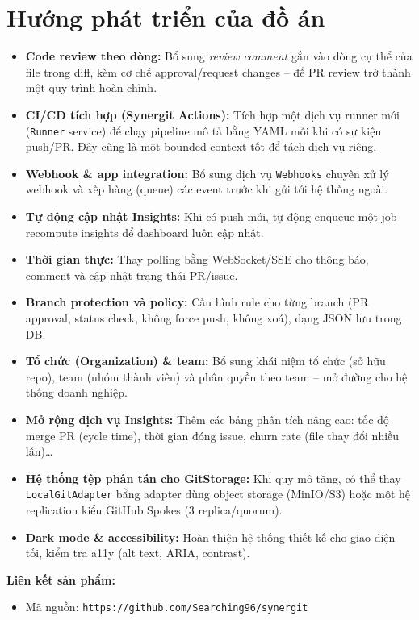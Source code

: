 \section{Hướng phát triển của đồ án}
\begin{itemize}
\item \textbf{Code review theo dòng:} Bổ sung \textit{review comment} gắn vào dòng cụ thể của file trong diff, kèm cơ chế approval/request changes -- để PR review trở thành một quy trình hoàn chỉnh.
\item \textbf{CI/CD tích hợp (Synergit Actions):} Tích hợp một dịch vụ runner mới (\texttt{Runner} service) để chạy pipeline mô tả bằng YAML mỗi khi có sự kiện push/PR. Đây cũng là một bounded context tốt để tách dịch vụ riêng.
\item \textbf{Webhook \& app integration:} Bổ sung dịch vụ \texttt{Webhooks} chuyên xử lý webhook và xếp hàng (queue) các event trước khi gửi tới hệ thống ngoài.
\item \textbf{Tự động cập nhật Insights:} Khi có push mới, tự động enqueue một job recompute insights để dashboard luôn cập nhật.
\item \textbf{Thời gian thực:} Thay polling bằng WebSocket/SSE cho thông báo, comment và cập nhật trạng thái PR/issue.
\item \textbf{Branch protection và policy:} Cấu hình rule cho từng branch (PR approval, status check, không force push, không xoá), dạng JSON lưu trong DB.
\item \textbf{Tổ chức (Organization) \& team:} Bổ sung khái niệm tổ chức (sở hữu repo), team (nhóm thành viên) và phân quyền theo team -- mở đường cho hệ thống doanh nghiệp.
\item \textbf{Mở rộng dịch vụ Insights:} Thêm các bảng phân tích nâng cao: tốc độ merge PR (cycle time), thời gian đóng issue, churn rate (file thay đổi nhiều lần)\ldots
\item \textbf{Hệ thống tệp phân tán cho GitStorage:} Khi quy mô tăng, có thể thay \texttt{LocalGitAdapter} bằng adapter dùng object storage (MinIO/S3) hoặc một hệ replication kiểu GitHub Spokes (3 replica/quorum).
\item \textbf{Dark mode \& accessibility:} Hoàn thiện hệ thống thiết kế cho giao diện tối, kiểm tra a11y (alt text, ARIA, contrast).
\end{itemize}

\vspace{6pt}
\noindent\textbf{Liên kết sản phẩm:}
\begin{itemize}
\item Mã nguồn: \texttt{https://github.com/Searching96/synergit}
\end{itemize}
